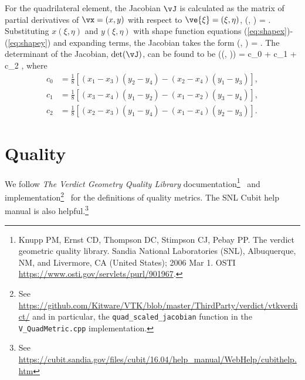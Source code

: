 \documentclass[14pt,letterpaper,fleqn]{extreport}
\begin{document}
For the quadrilateral element, the Jacobian $\vJ$ is calculated as 
the matrix of partial derivatives of $\vx = (x, y)$ with 
respect to $\ve{\xi} = (\xi, \eta)$, 
\be 
 \vJ(\xi, \eta)  
 \left[
  \frac{\partial \vx}{\partial \ve{\xi}}
 \right]
 = 
 .
\ee 
Substituting $x(\xi, \eta)$ and $y(\xi, \eta)$ with shape function equations
(\ref{eq:shapex})-(\ref{eq:shapey}) and expanding terms,  the Jacobian takes 
the form 
\be 
 \vJ(\xi, \eta) =  
  \left[ 
  \begin{tabular}{cc}
    $x_1$ & $y_1$ \\
    $x_2$ & $y_2$ \\
    $x_3$ & $y_3$ \\
    $x_4$ & $y_4$ \\
  \end{tabular}
  \right].
\ee 
The determinant of the Jacobian, $\det(\vJ)$, can be found to be 
\be 
\det(\vJ\left(\xi, \eta)\right) = c_0 + c_1 \xi + c_2 \eta,
  \label{eq:detJ}
\ee 
where
\begin{align}
  c_0 & = \frac{1}{8} \left[(x_1 - x_3) (y_2 - y_4) - (x_2 - x_4) (y_1 - y_3) \right], \\
  c_1 & = \frac{1}{8} \left[(x_3 - x_4) (y_1 - y_2) - (x_1 - x_2) (y_3 - y_4) \right], \\
  c_2 & = \frac{1}{8} \left[(x_2 - x_3) (y_1 - y_4) - (x_1 - x_4) (y_2 - y_3) \right].
\end{align}

\clearpage

\section{Quality}

We follow {\em The Verdict Geometry Quality Library} 
documentation\footnote{Knupp PM, Ernst CD, Thompson DC, Stimpson CJ, Pebay PP. 
The verdict geometric quality library. Sandia National Laboratories (SNL), 
Albuquerque, NM, and Livermore, CA (United States); 2006 Mar 1.  
OSTI \href{link}{https://www.osti.gov/servlets/purl/901967}.}~%
and 
implementation\footnote{See
\href{link}{https://github.com/Kitware/VTK/blob/master/ThirdParty/verdict/vtkverdict/}
and in particular, the {\tt quad\_scaled\_jacobian} function in the {\tt V\_QuadMetric.cpp} implementation.}~%
for the definitions of
quality metrics.  
The SNL Cubit help manual is also helpful.\footnote{See \href{link}{https://cubit.sandia.gov/files/cubit/16.04/help\_manual/WebHelp/cubithelp.htm}
}~%
\end{document}
